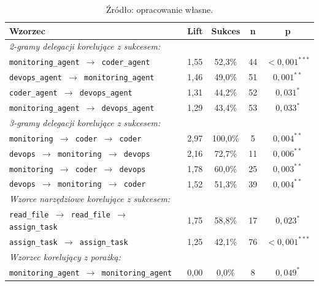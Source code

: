 \begin{table}[H]
    \centering
    \caption{Wzorce n-gramowe istotne statystycznie dla modelu GPT-5-nano (wariant z uczeniem, $p < 0{,}05$). Wzorce pogrupowane według kategorii i posortowane malejąco według lift.}
    \label{tab:ngrams-gpt5}
    \footnotesize
    \begin{tabular}{p{}cccc}
        \hline
        \textbf{Wzorzec} & \textbf{Lift} & \textbf{Sukces} & \textbf{n} & \textbf{p} \\
        \hline
        \multicolumn{5}{l}{\textit{2-gramy delegacji korelujące z sukcesem:}} \\[2pt]
        \texttt{monitoring\_agent $\to$ coder\_agent}            & 1,55 & 52,3\%  & 44 & $<0{,}001^{***}$ \\
        \texttt{devops\_agent $\to$ monitoring\_agent}           & 1,46 & 49,0\%  & 51 & $0{,}001^{**}$ \\
        \texttt{coder\_agent $\to$ devops\_agent}                & 1,31 & 44,2\%  & 52 & $0{,}031^{*}$ \\
        \texttt{monitoring\_agent $\to$ devops\_agent}           & 1,29 & 43,4\%  & 53 & $0{,}033^{*}$ \\
        \hline
        \multicolumn{5}{l}{\textit{3-gramy delegacji korelujące z sukcesem:}} \\[2pt]
        \texttt{monitoring $\to$ coder $\to$ coder}              & 2,97 & 100,0\% & 5  & $0{,}004^{**}$ \\
        \texttt{devops $\to$ monitoring $\to$ devops}            & 2,16 & 72,7\%  & 11 & $0{,}006^{**}$ \\
        \texttt{monitoring $\to$ coder $\to$ devops}             & 1,78 & 60,0\%  & 25 & $0{,}003^{**}$ \\
        \texttt{devops $\to$ monitoring $\to$ coder}             & 1,52 & 51,3\%  & 39 & $0{,}004^{**}$ \\
        \hline
        \multicolumn{5}{l}{\textit{Wzorce narzędziowe korelujące z sukcesem:}} \\[2pt]
        \texttt{read\_file $\to$ read\_file $\to$ assign\_task}  & 1,75 & 58,8\%  & 17 & $0{,}023^{*}$ \\
        \texttt{assign\_task $\to$ assign\_task}                 & 1,25 & 42,1\%  & 76 & $<0{,}001^{***}$ \\
        \hline
        \multicolumn{5}{l}{\textit{Wzorzec korelujący z porażką:}} \\[2pt]
        \texttt{monitoring\_agent $\to$ monitoring\_agent}       & 0,00 & 0,0\%   & 8  & $0{,}049^{*}$ \\
        \hline
    \end{tabular}
    \caption*{\footnotesize Źródło: opracowanie własne.}
\end{table}

